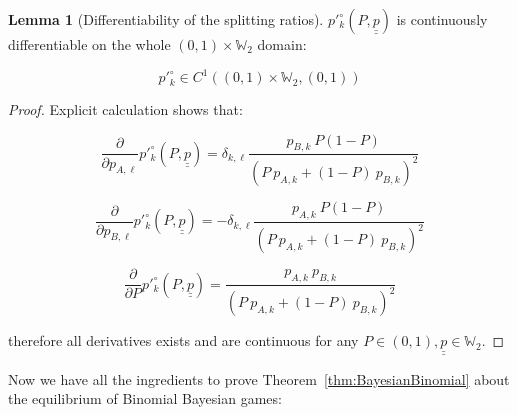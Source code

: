 \documentclass{article}
\theoremstyle{definition}
\newtheorem{lemma}{Lemma}[section]
\begin{document}
\begin{lemma}[Differentiability of the splitting ratios]
    \label{lemma:Diffpp}
    $p'^\circ_k(P,\underline{\underline{p}})$ is continuously differentiable on the whole $(0,1) \times \mathbb{W}_2$ domain:

    \begin{equation}
        p'^\circ_k \in C^1((0,1) \times \mathbb{W}_2,(0,1))
    \end{equation}
    
\end{lemma}

\begin{proof}
    Explicit calculation shows that:

    \begin{equation}
        \frac{\partial}{\partial p_{A,\ell}} p'^\circ_k
        (P,\underline{\underline{p}})
        = \delta_{k, \ell} \frac{p_{B,k} \ P (1-P)}{(P \ p_{A,k}+(1-P) \ p_{B,k})^2} 
    \end{equation}
    
    \begin{equation}
        \frac{\partial}{\partial p_{B,\ell}} p'^\circ_k
        (P,\underline{\underline{p}})
        = - \delta_{k, \ell} \frac{p_{A,k} \ P (1-P)}{(P \ p_{A,k}+(1-P) \ p_{B,k})^2} 
    \end{equation}

    \begin{equation}
        \frac{\partial}{\partial P} p'^\circ_k
        (P,\underline{\underline{p}})
        = \frac{p_{A,k} \ p_{B,k}}{(P \ p_{A,k}+(1-P) \ p_{B,k})^2} 
    \end{equation}

    therefore all derivatives exists and are continuous for any $P \in (0,1), \underline{\underline{p}} \in \mathbb{W}_2$.
    
\end{proof}



Now we have all the ingredients to prove Theorem~\ref{thm:BayesianBinomial} about the equilibrium of Binomial Bayesian games:
\end{document}
